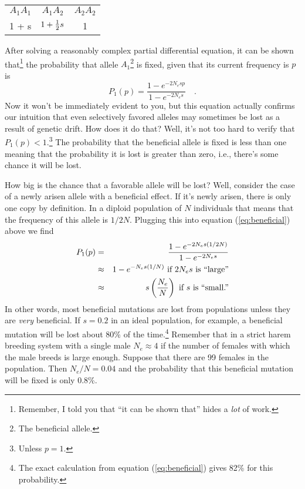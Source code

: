 \begin{center}
\begin{tabular}{ccc}
$A_1A_1$ & $A_1A_2$      & $A_2A_2$ \\
1 + s    & $1 + \frac{1}{2} s$ & 1
\end{tabular}
\end{center}

After solving a reasonably complex partial differential equation, it
can be shown that\footnote{Remember, I told you that ``it can be shown
that'' hides a {\it lot\/} of work.} the probability that allele
$A_1$\footnote{The beneficial allele.}  is fixed, given that its
current frequency is $p$ is
\begin{equation}
P_1(p) = \frac{1 - e^{-2N_esp}}{1 - e^{-2N_es}} \quad .
\label{eq:beneficial}
\end{equation}
Now it won't be immediately evident to you, but this equation actually
confirms our intuition that even selectively favored alleles may
sometimes be lost as a result of genetic drift. How does it do that?
Well, it's not too hard to verify that $P_1(p) < 1$.\footnote{Unless
  $p=1$.} The probability that the beneficial allele is fixed is less
than one meaning that the probability it is lost is greater than zero,
i.e., there's some chance it will be lost.

How big is the chance that a favorable allele will be
lost? Well, consider the
case of a newly arisen allele with a beneficial effect. If it's newly
arisen, there is only one copy by definition. In a diploid population
of $N$ individuals that means that the frequency of this allele is
$1/2N$. Plugging this into equation (\ref{eq:beneficial}) above we
find
\begin{eqnarray*}
P_1(p) &=& \frac{1 - e^{-2N_es(1/2N)}}{1 - e^{-2N_es}} \\
       &\approx& 1 - e^{-N_es(1/N)} \hbox{ if $2N_es$ is ``large''} \\
       &\approx& s\left(\frac{N_e}{N}\right)
                 \hbox{ if $s$ is ``small.''}
\end{eqnarray*}
In other words, most beneficial mutations are lost from populations
unless they are {\it very\/} beneficial. If $s=0.2$ in an ideal
population, for example, a beneficial mutation will be lost about 80\%
of the time.\footnote{The exact calculation from equation
  (\ref{eq:beneficial}) gives 82\% for this probability.} Remember
that in a strict harem breeding system with a single male $N_e \approx
4$ if the number of females with which the male breeds is large
enough. Suppose that there are 99 females in the population. Then
$N_e/N = 0.04$ and the probability that this beneficial mutation will
be fixed is only 0.8\%.

